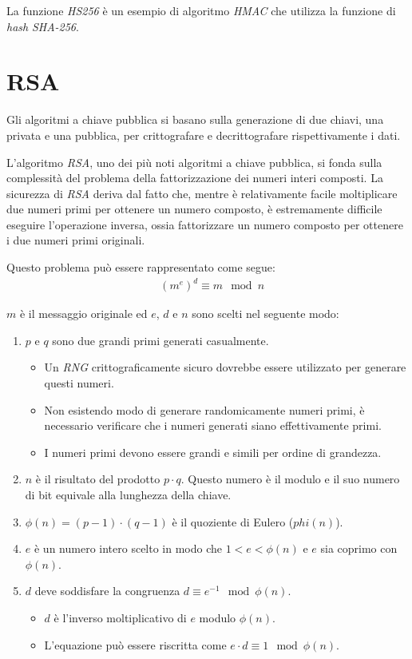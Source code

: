 \noindent La funzione \emph{HS256} è un esempio di algoritmo \emph{HMAC} che utilizza la funzione di \emph{hash} \emph{SHA-256}.


\section{RSA}
Gli algoritmi a chiave pubblica si basano sulla generazione di due chiavi, una privata e una pubblica, per crittografare e decrittografare rispettivamente i dati.

L'algoritmo \emph{RSA}, uno dei più noti algoritmi a chiave pubblica, si fonda sulla complessità del problema della fattorizzazione dei numeri interi composti.
La sicurezza di \emph{RSA} deriva dal fatto che, mentre è relativamente facile moltiplicare due numeri primi per ottenere un numero composto, è estremamente difficile eseguire l'operazione inversa, ossia fattorizzare un numero composto per ottenere i due numeri primi originali.

\noindent Questo problema può essere rappresentato come segue:
\begin{equation}
	\begin{aligned}
		&(m^e)^d \equiv m \mod n
	\end{aligned}
\end{equation}

\noindent $m$ è il messaggio originale ed $e$, $d$ e $n$ sono scelti nel seguente modo:
\begin{enumerate}
	\item $p$ e $q$ sono due grandi primi generati casualmente.
	      \begin{itemize}
		      \item Un \emph{\gls{RNG}} crittograficamente sicuro dovrebbe essere utilizzato per generare questi numeri.
		      \item Non esistendo modo di generare randomicamente numeri primi, è necessario verificare che i numeri generati siano effettivamente primi.
		      \item I numeri primi devono essere grandi e simili per ordine di grandezza.
	      \end{itemize}
	\item $n$ è il risultato del prodotto $p \cdot q$. Questo numero è il modulo e il suo numero di bit equivale alla lunghezza della chiave.
	\item $\phi(n) = (p - 1) \cdot (q - 1)$ è il quoziente di Eulero ($phi(n)$).
	\item $e$ è un numero intero scelto in modo che $1 < e < \phi(n)$ e $e$ sia coprimo con $\phi(n)$.
	\item $d$ deve soddisfare la congruenza $d \equiv e^{-1} \mod \phi(n)$.
	      \begin{itemize}
		      \item $d$ è l'inverso moltiplicativo di $e$ modulo $\phi(n)$.
		      \item L'equazione può essere riscritta come $e \cdot d \equiv 1 \mod \phi(n)$.
	      \end{itemize}
\end{enumerate}

